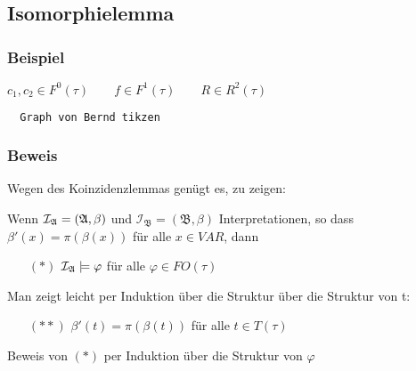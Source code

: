 \subsection{Isomorphielemma}

\subsubsection{Beispiel}

$c_1, c_2  \in F^0(\tau) \qquad f \in F^1(\tau) \qquad R \in R^2(\tau)$

\begin{verbatim}
  Graph von Bernd tikzen
\end{verbatim}

\subsubsection{Beweis}

Wegen des Koinzidenzlemmas genügt es, zu zeigen:

Wenn $\mathcal{I}_{\mathfrak{A}} = (\mathfrak{A},\beta)$ und $\mathcal{I}_\mathfrak{B} = (\mathfrak{B}, \beta)$ Interpretationen,
so dass $\beta'(x) = \pi(\beta(x))$ für alle $x\in VAR$, dann

\begin{itemize}
  \item[$(*)$] $\mathcal{I}_{\mathfrak{A}} \models \varphi$ für alle $\varphi \in FO(\tau)$
\end{itemize}

Man zeigt leicht per Induktion über die Struktur über die Struktur von t:

\begin{itemize}
  \item[$(**)$] $\beta'(t) = \pi(\beta(t))$ für alle $t \in T(\tau)$
\end{itemize}

Beweis von $(*)$ per Induktion über die Struktur von $\varphi$

